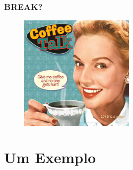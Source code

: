 \documentclass[hyperref={pdfpagelabels=true}]{beamer}
\begin{document}
\begin{frame}
\frametitle{\huge{BREAK?}}
  \begin{figure}
    \begin{center}
	\includegraphics[width=0.5\textwidth ]{coffee_talk.jpg}
    \end{center}
  \end{figure}    
\end{frame}

\section{Um Exemplo}
\end{document}
